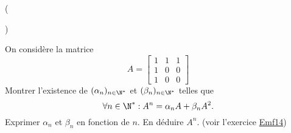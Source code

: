 \begin{tiny}()\end{tiny}
On considère la matrice
\[
A=
 \begin{bmatrix}
  1 & 1 & 1 \\
1 & 0 & 0 \\
1 & 0 & 0
 \end{bmatrix}
\]
Montrer l'existence de $(\alpha _{n})_{n\in \N^{*}}$ et $(\beta _{n})_{n\in \N^{*}}$ telles que
\[
\forall n\in \N^{*} : A^{n}=\alpha _{n}A+\beta _{n}A^{2}. 
\]
Exprimer $\alpha_n$ et $\beta_n$ en fonction de $n$. En déduire $A^n$. (voir l'exercice \hyperref{\baseurl exos_nicolair/_fex_mf.pdf}{exo}{Emf14}{Emf14})
